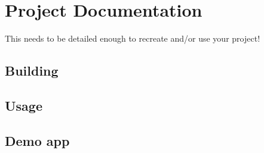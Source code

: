 \chapter{Project Documentation}


This needs to be detailed enough to recreate and/or use your project!

\section{Building}

\section{Usage}



\section{Demo app}